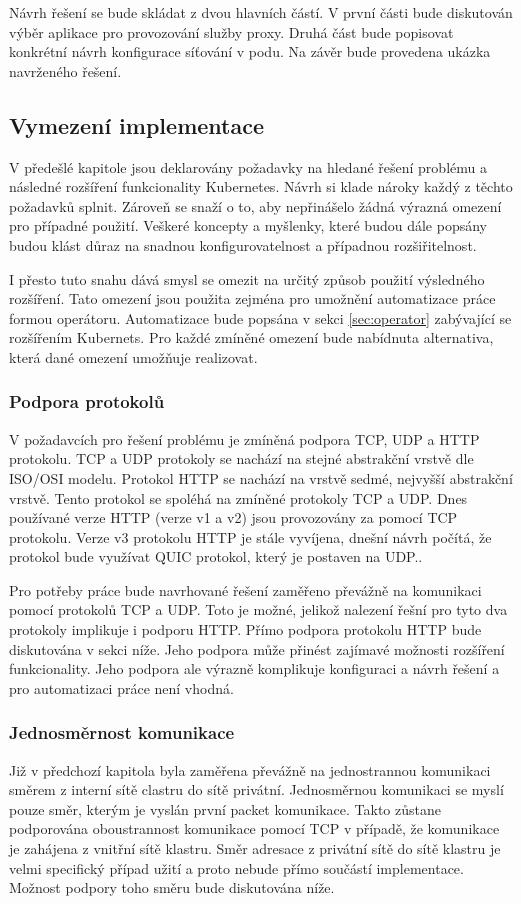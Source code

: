 Návrh řešení se bude skládat z dvou hlavních částí. V první části bude diskutován výběr aplikace pro provozování služby proxy. Druhá část bude popisovat konkrétní návrh konfigurace síťování v podu. Na závěr bude provedena ukázka navrženého řešení.

\subsection{Vymezení implementace}
V předešlé kapitole jsou deklarovány požadavky na hledané řešení problému a následné rozšíření funkcionality Kubernetes. Návrh si klade nároky každý z těchto požadavků splnit. Zároveň se snaží o to, aby nepřinášelo žádná výrazná omezení pro případné použití. Veškeré koncepty a myšlenky, které budou dále popsány budou klást důraz na snadnou konfigurovatelnost a případnou rozšiřitelnost.

I přesto tuto snahu dává smysl se omezit na určitý způsob použití výsledného rozšíření. Tato omezení jsou použita zejména pro umožnění automatizace práce formou operátoru. Automatizace bude popsána v sekci \ref{sec:operator} zabývající se rozšířením Kubernets. Pro každé zmíněné omezení bude nabídnuta alternativa, která dané omezení umožňuje realizovat. 

\subsubsection*{Podpora protokolů}
V požadavcích pro řešení problému je zmíněná podpora TCP, UDP a HTTP protokolu. TCP a UDP protokoly se nachází na stejné abstrakční vrstvě dle ISO/OSI modelu. Protokol HTTP se nachází na vrstvě sedmé, nejvyšší abstrakční vrstvě. Tento protokol se spoléhá na zmíněné protokoly TCP a UDP. Dnes používané verze HTTP (verze v1 a v2) jsou provozovány za pomocí TCP protokolu. Verze v3 protokolu HTTP je stále vyvíjena, dnešní návrh počítá, že protokol bude využívat QUIC protokol, který je postaven na UDP.\cite{fesl_2021_aplikan}.

Pro potřeby práce bude navrhované řešení zaměřeno převážně na komunikaci pomocí protokolů TCP a UDP. Toto je možné, jelikož nalezení řešní pro tyto dva protokoly implikuje i podporu HTTP. Přímo podpora protokolu HTTP bude diskutována v sekci níže. Jeho podpora může přinést zajímavé možnosti rozšíření funkcionality. Jeho podpora ale výrazně komplikuje konfiguraci a návrh řešení a pro automatizaci práce není vhodná.

\subsubsection*{Jednosměrnost komunikace}\label{vymezeni:1smer}
Již v předchozí kapitola byla zaměřena převážně na jednostrannou komunikaci směrem z interní sítě clastru do sítě privátní. Jednosměrnou komunikaci se myslí pouze směr, kterým je vyslán první packet komunikace. Takto zůstane podporována oboustrannost komunikace pomocí TCP v případě, že komunikace je zahájena z vnitřní sítě klastru. Směr adresace z privátní sítě do sítě klastru je velmi specifický případ užití a proto nebude přímo součástí implementace. Možnost podpory toho směru bude diskutována níže.

